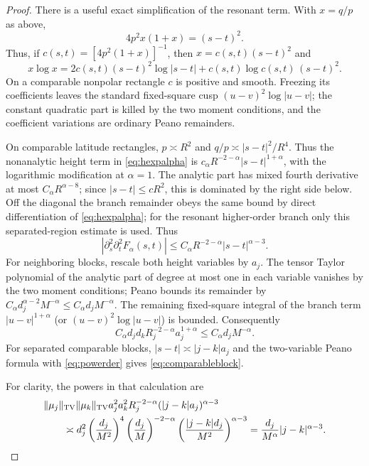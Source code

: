 \documentclass[11pt]{amsart}
\begin{document}
\begin{proof}
There is a useful exact simplification of the resonant term.  With
$x=q/p$ as above,
\[
 4p^2x(1+x)=(s-t)^2.
\]
Thus, if $c(s,t)=[4p^2(1+x)]^{-1}$, then
$x=c(s,t)(s-t)^2$ and
\begin{equation}\label{eq:resonantextraction}
 x\log x
 =2c(s,t)(s-t)^2\log|s-t|
  +c(s,t)\log c(s,t)\,(s-t)^2.                       \tag{5.6}
\end{equation}
On a comparable nonpolar rectangle $c$ is positive and smooth.  Freezing
its coefficients leaves the standard fixed-square cusp
$(u-v)^2\log|u-v|$; the constant quadratic part is killed by the two moment
conditions, and the coefficient variations are ordinary Peano remainders.

On comparable latitude rectangles, $p\asymp R^2$ and
$q/p\asymp |s-t|^2/R^4$.  Thus the nonanalytic height term in
\eqref{eq:hexpalpha} is
$c_\alpha R^{-2-\alpha}|s-t|^{1+\alpha}$, with the logarithmic modification
at $\alpha=1$.  The analytic part has mixed fourth derivative at most
$C_\alpha R^{\alpha-8}$; since $|s-t|\le cR^2$, this is dominated by the
right side below.  Off the diagonal the branch remainder obeys the same
bound by direct differentiation of \eqref{eq:hexpalpha}; for the resonant
higher-order branch only this separated-region estimate is used.  Thus
\begin{equation}\label{eq:powerder}
 |\partial_s^2\partial_t^2F_\alpha(s,t)|
 \le C_\alpha R^{-2-\alpha}|s-t|^{\alpha-3}.         \tag{5.7}
\end{equation}
For neighboring blocks, rescale both height variables by $a_j$.  The tensor
Taylor polynomial of the analytic part of degree at most one in each
variable vanishes by the two moment conditions; Peano bounds its remainder
by $C_\alpha d_j^{\alpha-2}M^{-\alpha}\le
C_\alpha d_jM^{-\alpha}$.  The remaining fixed-square integral of the branch
term $|u-v|^{1+\alpha}$ (or $(u-v)^2\log|u-v|$) is bounded.  Consequently
\[
 C_\alpha d_jd_kR_j^{-2-\alpha}a_j^{1+\alpha}
 \le C_\alpha d_jM^{-\alpha}.
\]
For separated comparable blocks, $|s-t|\asymp|j-k|a_j$ and the
two-variable Peano formula with \eqref{eq:powerder} gives
\eqref{eq:comparableblock}.

For clarity, the powers in that calculation are
\begin{align*}
 &\|\mu_j\|_{\rm TV}\|\mu_k\|_{\rm TV}
 a_j^2a_k^2R_j^{-2-\alpha}(|j-k|a_j)^{\alpha-3}\\
 &\qquad\asymp
 d_j^2\left(\frac{d_j}{M^2}\right)^4
 \left(\frac{d_j}{M}\right)^{-2-\alpha}
 \left(\frac{|j-k|d_j}{M^2}\right)^{\alpha-3}
 =\frac{d_j}{M^\alpha}|j-k|^{\alpha-3}.
\end{align*}


\end{proof}
\end{document}
